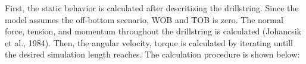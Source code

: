First, the static behavior is calculated after descritizing the drillstring. Since the model assumes the off-bottom scenario, WOB and TOB is zero. The normal force, tension, and momentum throughout the drillstring is calculated (Johancsik et al., 1984). Then, the angular velocity, torque is calculated by iterating untill the desired simulation length reaches. The calculation procedure is shown below: 

%

